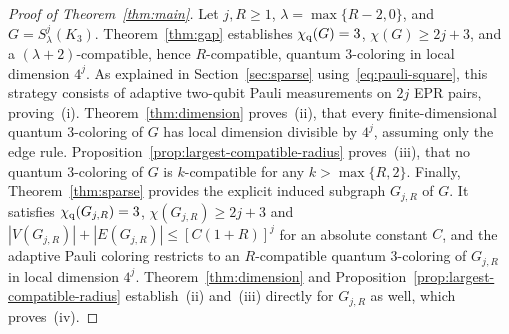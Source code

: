 \begin{proof}[Proof of Theorem~\ref{thm:main}]
Let $j,R\ge1$, $\lambda=\max\{R-2,0\}$, and $G=S^j_\lambda(K_3)$. Theorem~\ref{thm:gap} establishes $\chi_{\mathrm q}(G)=3$, $\chi(G)\ge2j+3$, and a $(\lambda+2)$-compatible, hence $R$-compatible, quantum $3$-coloring in local dimension $4^j$. As explained in Section~\ref{sec:sparse} using~\eqref{eq:pauli-square}, this strategy consists of adaptive two-qubit Pauli measurements on $2j$ EPR pairs, proving~(i). Theorem~\ref{thm:dimension} proves~(ii), that every finite-dimensional quantum $3$-coloring of $G$ has local dimension divisible by $4^j$, assuming only the edge rule. Proposition~\ref{prop:largest-compatible-radius} proves~(iii), that no quantum $3$-coloring of $G$ is $k$-compatible for any $k>\max\{R,2\}$. Finally, Theorem~\ref{thm:sparse} provides the explicit induced subgraph $G_{j,R}$ of $G$. It satisfies $\chi_{\mathrm q}(G_{j,R})=3$, $\chi(G_{j,R})\ge2j+3$ and $|V(G_{j,R})|+|E(G_{j,R})|\le[C(1+R)]^j$ for an absolute constant $C$, and the adaptive Pauli coloring restricts to an $R$-compatible quantum $3$-coloring of $G_{j,R}$ in local dimension $4^j$. Theorem~\ref{thm:dimension} and Proposition~\ref{prop:largest-compatible-radius} establish~(ii) and~(iii) directly for $G_{j,R}$ as well, which proves~(iv).
\end{proof}
